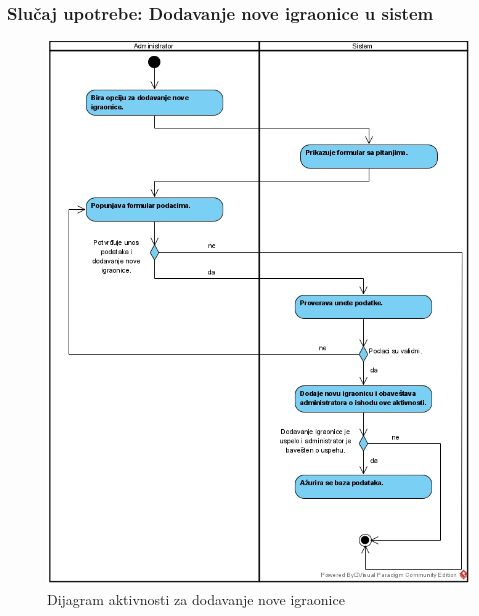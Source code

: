 \documentclass[a4paper]{article}
\begin{document}
\subsubsection{Slučaj upotrebe: Dodavanje nove igraonice u sistem}

\begin{figure}[!ht]
\begin{center}
\includegraphics[scale=0.53]{sections/images/dijagram_aktivnosti_dodavanja_nove_igraonice.jpg}
\end{center}
\caption{Dijagram aktivnosti za dodavanje nove igraonice}
\label{fig:kontekst}
\end{figure}
\end{document}
